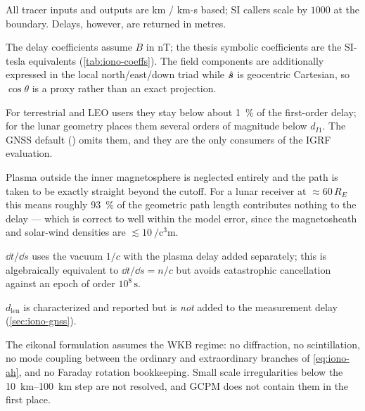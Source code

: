 \begin{description}[style=nextline, leftmargin=1.2em]
  \item[Km-unit convention.]
    All tracer inputs and outputs are km / km-s based; SI callers scale by
    $1000$ at the boundary.  Delays, however, are returned in metres.

  \item[Magnetic-field units.]
    The delay coefficients assume $B$ in \si{\nano\tesla}; the thesis symbolic
    coefficients are the SI-tesla equivalents (\cref{tab:iono-coeffs}).  The
    field components are additionally expressed in the local north/east/down
    triad while $\hat{\bm{s}}$ is geocentric Cartesian, so $\cos\theta$ is a proxy
    rather than an exact projection.

  \item[Second and third order are small.]
    For terrestrial and LEO users they stay below about \SI{1}{\percent} of the
    first-order delay; for the lunar geometry
    \citep[Tab.~5.2]{iiyama2026thesis} places them several orders of magnitude
    below $d_{I1}$.  The GNSS default () omits them, and they are
    the only consumers of the IGRF evaluation.

  \item[Cutoff at $4\,R_E$.]
    Plasma outside the inner magnetosphere is neglected entirely and the path is
    taken to be exactly straight beyond the cutoff.  For a lunar receiver at
    $\approx 60\,R_E$ this means roughly \SI{93}{\percent} of the geometric path
    length contributes nothing to the delay --- which is correct to well within
    the model error, since the magnetosheath and solar-wind densities are
    $\lesssim \SI{10}{\per\cubic\centi\meter}$.

  \item[Time integration.]
    $\dd t/\dd s$ uses the vacuum $1/c$ with the plasma delay added separately;
    this is algebraically equivalent to $\dd t/\dd s = n/c$ but avoids
    catastrophic cancellation against an epoch of order $10^{8}\,\si{\second}$.

  \item[Excess path length.]
    $d_\mathrm{len}$ is characterized and reported but is \emph{not} added to the
    measurement delay (\cref{sec:iono-gnss}).

  \item[Geometric optics only.]
    The eikonal formulation assumes the WKB regime: no diffraction, no
    scintillation, no mode coupling between the ordinary and extraordinary
    branches of \cref{eq:iono-ah}, and no Faraday rotation bookkeeping.  Small
    scale irregularities below the \SIrange{10}{100}{\kilo\meter} step are not
    resolved, and GCPM does not contain them in the first place.


\end{description}
